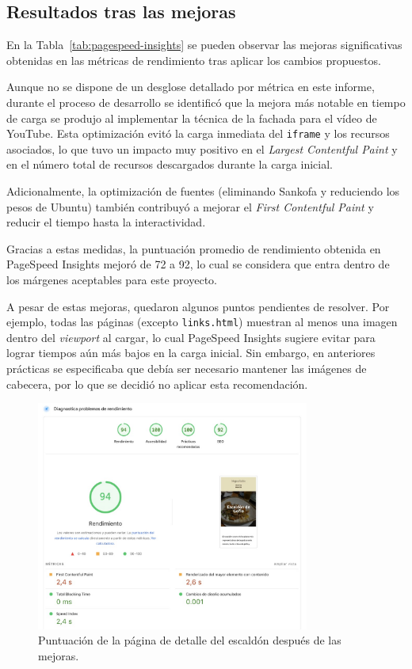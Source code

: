 \documentclass{article}
\begin{document}
\subsection{Resultados tras las mejoras}\label{subsec:resultados-tras-las-mejoras}

En la Tabla~\ref{tab:pagespeed-insights} se pueden observar las mejoras significativas obtenidas en las métricas de rendimiento tras aplicar los cambios propuestos.

Aunque no se dispone de un desglose detallado por métrica en este informe, durante el proceso de desarrollo se identificó que la mejora más notable en tiempo de carga se produjo al implementar la técnica de la fachada para el vídeo de YouTube. Esta optimización evitó la carga inmediata del \texttt{iframe} y los recursos asociados, lo que tuvo un impacto muy positivo en el \textit{Largest Contentful Paint} y en el número total de recursos descargados durante la carga inicial.

Adicionalmente, la optimización de fuentes (eliminando Sankofa y reduciendo los pesos de Ubuntu) también contribuyó a mejorar el \textit{First Contentful Paint} y reducir el tiempo hasta la interactividad.

Gracias a estas medidas, la puntuación promedio de rendimiento obtenida en PageSpeed Insights mejoró de 72 a 92, lo cual se considera que entra dentro de los márgenes aceptables para este proyecto.

A pesar de estas mejoras, quedaron algunos puntos pendientes de resolver. Por ejemplo, todas las páginas (excepto \texttt{links.html}) muestran al menos una imagen dentro del \textit{viewport} al cargar, lo cual PageSpeed Insights sugiere evitar para lograr tiempos aún más bajos en la carga inicial. Sin embargo, en anteriores prácticas se  especificaba que debía ser necesario mantener las imágenes de cabecera, por lo que se decidió no aplicar esta recomendación.

\begin{figure}[h!]
    \centering
    \includegraphics[width=0.8\textwidth]{./img/p3/escaldon-performance-after}
    \caption{Puntuación de la página de detalle del escaldón después de las mejoras.}
    \label{fig:escaldon-performance-after}
\end{figure}
\end{document}
